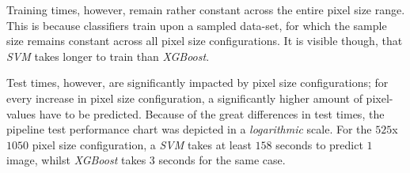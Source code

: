 Training times, however, remain rather constant across the entire pixel size range. This is because classifiers train upon a sampled data-set, for which the sample size remains constant across all pixel size configurations. It is visible though, that \textit{SVM} takes longer to train than \textit{XGBoost}.

Test times, however, are significantly impacted by pixel size configurations; for every increase in pixel size configuration, a significantly higher amount of pixel-values have to be predicted. Because of the great differences in test times, the pipeline test performance chart was depicted in a \textit{logarithmic} scale. For the $525$x$1050$ pixel size configuration, a \textit{SVM} takes at least $158$ seconds to predict $1$ image, whilst \textit{XGBoost} takes $3$ seconds for the same case.
